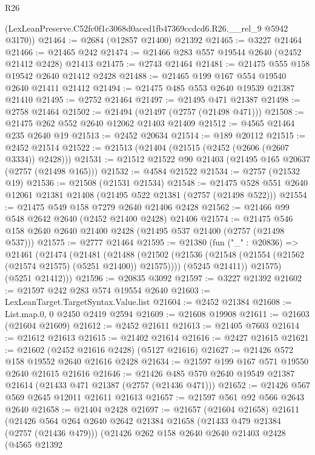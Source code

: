 \begin{lexlean}{R26}
\begin{coremodule}
      (LexLeanPreserve.C52fc0f1c3068d0aced1fb47369ccdcd6.R26.__rel_9 @5942 @3170))
@21464 := @2684 (@12857 @21400) @21392
@21465 := @3227 @21464
@21466 := @21465 @242
@21474 := @21466 @283 @557 @19544 @2640 (@2452 @21412 @2428) @21413
@21475 := @2743 @21464
@21481 := @21475 @555 @158 @19542 @2640 @21412 @2428
@21488 := @21465 @199 @167 @554 @19540 @2640 @21411 @21412
@21494 := @21475 @485 @553 @2640 @19539 @21387 @21410
@21495 := @2752 @21464
@21497 := @21495 @471 @21387
@21498 := @2758 @21464
@21502 := @21494 (@21497 (@2757 (@21498 @471)))
@21508 := @21475 @262 @552 @2640 @12062 @21403 @21409
@21512 := @4565 @21464 @235 @2640 @19
@21513 := @2452 @20634
@21514 := @189 @20112
@21515 := @2452 @21514
@21522 := @21513 (@21404 (@21515 (@2452 (@2606 (@2607 @3334)) @2428)))
@21531 := @21512 @21522 @90 @21403 (@21495 @165 @20637 (@2757 (@21498 @165)))
@21532 := @4584 @21522
@21534 := @2757 (@21532 @19)
@21536 := @21508 (@21531 @21534)
@21548 := @21475 @528 @551 @2640 @12061 @21381 @21408 (@21495 @522 @21381 (@2757 (@21498 @522)))
@21554 := @21475 @549 @158 @7279 @2640 @21406 @2428
@21562 := @21466 @99 @548 @2642 @2640 (@2452 @21400 @2428) @21406
@21574 := @21475 @546 @158 @2640 @2640 @21400 @2428 (@21495 @537 @21400 (@2757 (@21498 @537)))
@21575 := @2777 @21464
@21595 := @21380
    (fun ("_" : @20836) =>
    @21461
      (@21474
        (@21481
          (@21488
            (@21502 (@21536 (@21548 (@21554 (@21562 (@21574 @21575) (@5251 @21400)) @21575))))
            (@5245 @21411))
          @21575)
        (@5251 @21412)))
@21596 := @20835 @3092
@21597 := @3227 @21392
@21602 := @21597 @242 @283 @574 @19554 @2640
@21603 := LexLeanTarget.TargetSyntax.Value.list
@21604 := @2452 @21384
@21608 := List.map.{0, 0} @2450 @2419 @2594
@21609 := @21608 @19908
@21611 := @21603 (@21604 @21609)
@21612 := @2452 @21611
@21613 := @21405 @7603
@21614 := @21612 @21613
@21615 := @21402 @21614
@21616 := @2427 @21615
@21621 := @21602 (@2452 @21616 @2428) (@5127 @21616)
@21627 := @21426 @572 @158 @19552 @2640 @21616 @2428
@21634 := @21597 @199 @167 @571 @19550 @2640 @21615 @21616
@21646 := @21426 @485 @570 @2640 @19549 @21387 @21614 (@21433 @471 @21387 (@2757 (@21436 @471)))
@21652 := @21426 @567 @569 @2645 @12011 @21611 @21613
@21657 := @21597 @561 @92 @566 @2643 @2640
@21658 := @21404 @2428
@21697 := @21657
    (@21604 @21658)
    @21611
    (@21426
      @564
      @264
      @2640
      @2642
      @21384
      @21658
      (@21433 @479 @21384 (@2757 (@21436 @479)))
      (@21426
        @262
        @158
        @2640
        @2640
        @21403
        @2428
        (@4565
          @21392

\end{coremodule}
\end{lexlean}

